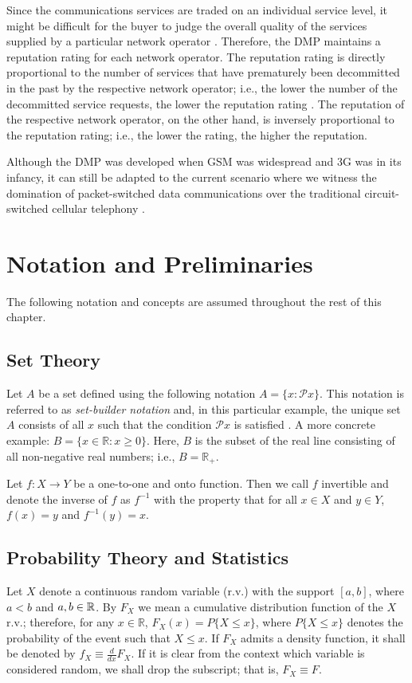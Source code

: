 Since the communications services are traded on an individual service level, it might be difficult for the buyer to judge the overall quality of the services supplied by a particular network operator \cite{DMIrvine02}. Therefore, the DMP maintains a reputation rating for each network operator. The reputation rating is directly proportional to the number of services that have prematurely been decommitted in the past by the respective network operator; i.e., the lower the number of the decommitted service requests, the lower the reputation rating \cite{DMLeBodic00}. The reputation of the respective network operator, on the other hand, is inversely proportional to the reputation rating; i.e., the lower the rating, the higher the reputation.

Although the DMP was developed when GSM was widespread and 3G was in its infancy, it can still be adapted to the current scenario where we witness the domination of packet-switched data communications over the traditional circuit-switched cellular telephony \cite{Ericsson2011}.

\section{Notation and Preliminaries} %
\label{sec:notation_and_preliminaries}
The following notation and concepts are assumed throughout the rest of this chapter.

\subsection{Set Theory} %
\label{sub:notation_set_theory}
Let $A$ be a set defined using the following notation $A = \{x: \mathcal{P}x\}$. This notation is referred to as \emph{set-builder notation} and, in this particular example, the unique set $A$ consists of all $x$ such that the condition $\mathcal{P}x$ is satisfied \cite{Carter2001}. A more concrete example: $B = \{x\in\mathbb{R}: x\ge 0\}$. Here, $B$ is the subset of the real line consisting of all non-negative real numbers; i.e., $B=\mathbb{R}_+$.

Let $f: X\to Y$ be a one-to-one and onto function. Then we call $f$ invertible and denote the inverse of $f$ as $f^{-1}$ with the property that for all $x\in X$ and $y\in Y$, $f(x) = y$ and $f^{-1}(y) = x$.

\subsection{Probability Theory and Statistics} %
\label{sub:notation_probability}
Let $X$ denote a continuous random variable (r.v.) with the support $[a, b]$, where $a < b$ and $a, b \in\nobreak\mathbb{R}$. By $F_{X}$ we mean a cumulative distribution function of the $X$ r.v.; therefore, for any $x\in\mathbb{R}$, $F_{X}(x) = P\{X \le x\}$, where $P\{X\le x\}$ denotes the probability of the event such that $X\le x$. If $F_{X}$ admits a density function, it shall be denoted by $f_{X} \equiv \frac{d}{dx}F_{X}$. If it is clear from the context which variable is considered random, we shall drop the subscript; that is, $F_{X}\equiv F$.

